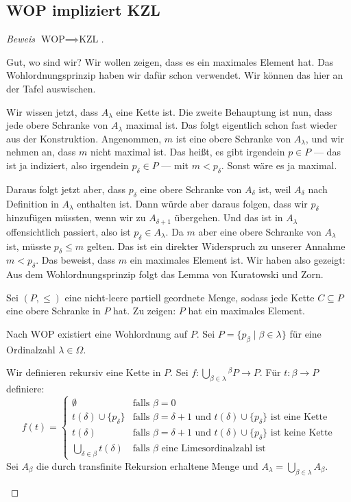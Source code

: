 \subsection{WOP impliziert KZL}

\begin{proof}[Beweis $\text{WOP} \implies \text{KZL}$]
\begin{spoken-clean}[00:52:08 - 00:54:00]
Gut, wo sind wir? Wir wollen zeigen, dass es ein maximales Element hat. Das Wohlordnungsprinzip haben wir dafür schon verwendet. Wir können das hier an der Tafel auswischen.

Wir wissen jetzt, dass $A_\lambda$ eine Kette ist. Die zweite Behauptung ist nun, dass jede obere Schranke von $A_\lambda$ maximal ist. Das folgt eigentlich schon fast wieder aus der Konstruktion. Angenommen, $m$ ist eine obere Schranke von $A_\lambda$, und wir nehmen an, dass $m$ nicht maximal ist. Das heißt, es gibt irgendein $p \in P$ --- das ist ja indiziert, also irgendein $p_\delta \in P$ --- mit $m < p_\delta$. Sonst wäre es ja maximal.
\end{spoken-clean}

\begin{spoken-clean}[00:54:00 - 00:56:45]
Daraus folgt jetzt aber, dass $p_\delta$ eine obere Schranke von $A_\delta$ ist, weil $A_\delta$ nach Definition in $A_\lambda$ enthalten ist. Dann würde aber daraus folgen, dass wir $p_\delta$ hinzufügen müssten, wenn wir zu $A_{\delta+1}$ übergehen. Und das ist in $A_\lambda$ offensichtlich passiert, also ist $p_\delta \in A_\lambda$. Da $m$ aber eine obere Schranke von $A_\lambda$ ist, müsste $p_\delta \le m$ gelten. Das ist ein direkter Widerspruch zu unserer Annahme $m < p_\delta$. Das beweist, dass $m$ ein maximales Element ist. Wir haben also gezeigt: Aus dem Wohlordnungsprinzip folgt das Lemma von Kuratowski und Zorn.
\end{spoken-clean}

\begin{math-stroke}
Sei $(P, \le)$ eine nicht-leere partiell geordnete Menge, sodass jede Kette $C \subseteq P$ eine obere Schranke in $P$ hat.
Zu zeigen: $P$ hat ein maximales Element.

Nach $\text{WOP}$ existiert eine Wohlordnung auf $P$.
Sei $P = \{ p_\beta \mid \beta \in \lambda \}$ für eine Ordinalzahl $\lambda \in \Omega$.

Wir definieren rekursiv eine Kette in $P$.
Sei $f: \bigcup_{\beta \in \lambda} {}^{\beta}P \to P$.
Für $t: \beta \to P$ definiere:
\[
f(t) = \begin{cases}
\emptyset & \text{falls } \beta = 0 \\
t(\delta) \cup \{p_\delta\} & \text{falls } \beta = \delta+1 \text{ und } t(\delta) \cup \{p_\delta\} \text{ ist eine Kette} \\
t(\delta) & \text{falls } \beta = \delta+1 \text{ und } t(\delta) \cup \{p_\delta\} \text{ ist keine Kette} \\
\bigcup_{\delta \in \beta} t(\delta) & \text{falls } \beta \text{ eine Limesordinalzahl ist}
\end{cases}
\]
Sei $A_\beta$ die durch transfinite Rekursion erhaltene Menge und $A_\lambda = \bigcup_{\beta \in \lambda} A_\beta$.


\end{math-stroke}
\end{proof}
